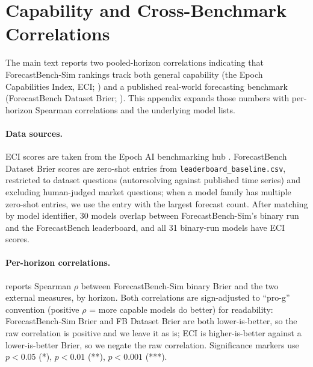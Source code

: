 \documentclass{article}
\begin{document}
\clearpage
\section{Capability and Cross-Benchmark Correlations}
\label{app:capability-correlations}

The main text reports two pooled-horizon correlations indicating that ForecastBench-Sim rankings track both general capability (the Epoch Capabilities Index, ECI; \citealp{ho2025rosetta}) and a published real-world forecasting benchmark (ForecastBench Dataset Brier; \citealp{karger2024forecastbench}). This appendix expands those numbers with per-horizon Spearman correlations and the underlying model lists.

\paragraph{Data sources.} ECI scores are taken from the Epoch AI benchmarking hub \citep{epoch2026benchmarks}. ForecastBench Dataset Brier scores are zero-shot entries from \texttt{leaderboard\_baseline.csv}, restricted to dataset questions (autoresolving against published time series) and excluding human-judged market questions; when a model family has multiple zero-shot entries, we use the entry with the largest forecast count. After matching by model identifier, 30 models overlap between ForecastBench-Sim's binary run and the ForecastBench leaderboard, and all 31 binary-run models have ECI scores.

\paragraph{Per-horizon correlations.}  reports Spearman $\rho$ between ForecastBench-Sim binary Brier and the two external measures, by horizon. Both correlations are sign-adjusted to ``pro-g'' convention (positive $\rho$ = more capable models do better) for readability: ForecastBench-Sim Brier and FB Dataset Brier are both lower-is-better, so the raw correlation is positive and we leave it as is; ECI is higher-is-better against a lower-is-better Brier, so we negate the raw correlation. Significance markers use $p < 0.05$ (*), $p < 0.01$ (**), $p < 0.001$ (***).
\end{document}
